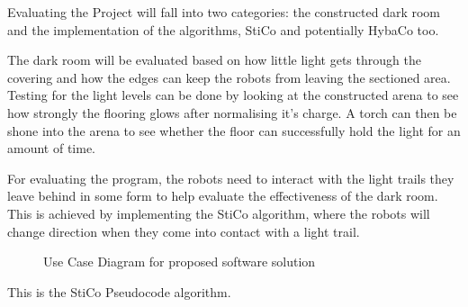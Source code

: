 \label{desBaseEval}
Evaluating the Project will fall into two categories:  the constructed dark
room and the implementation of the algorithms, StiCo and potentially HybaCo
too.

The dark room will be evaluated based on how little light gets through the
covering and how the edges can keep the robots from leaving the sectioned area.
Testing for the light levels can be done by looking at the constructed arena to
see how strongly the flooring glows after normalising it's charge.  A torch can
then be shone into the arena to see whether the floor can successfully hold the
light for an amount of time.

For evaluating the program, the robots need to interact with the light trails
they leave behind in some form to help evaluate the effectiveness of the dark 
room.  This is achieved by implementing the StiCo algorithm, where the robots
will change direction when they come into contact with a light trail.



\begin{figure}[h!]
  \label{desUseCase}
  \caption{Use Case Diagram for proposed software solution}
\end{figure}




This is the StiCo Pseudocode algorithm\cite{Ranjbar-Sahraei2012Demo}.

